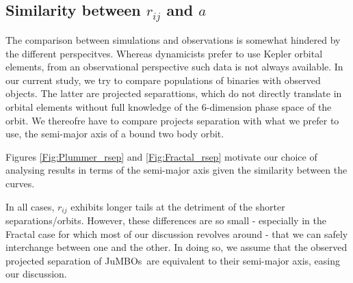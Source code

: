 \documentclass[submission,phys]{lib/SciPost}
\newcommand{\jumbos}{\mbox{JuMBOs}}
\begin{document}
\begin{appendix}
  \section{Similarity between $r_{ij}$ and $a$}\label{Appendix:A}

  The comparison between simulations and observations is somewhat
  hindered by the different perspecitves. Whereas dynamicists prefer
  to use Kepler orbital elements, from an observational perspective
  such data is not always available. In our current study, we try to
  compare populations of binaries with observed objects. The latter
  are projected separattions, which do not directly translate in
  orbital elements without full knowledge of the 6-dimension phase
  space of the orbit. We thereofre have to compare projects separation
  with what we prefer to use, the semi-major axis of a bound two body
  orbit.

  Figures \ref{Fig:Plummer_rsep} and \ref{Fig:Fractal_rsep} motivate
  our choice of analysing results in terms of the semi-major axis
  given the similarity between the curves.
    
  In all cases, $r_{ij}$ exhibits longer tails at the detriment of the
  shorter separations/orbits. However, these differences are so small
  - especially in the Fractal case for which most of our discussion
  revolves around - that we can safely interchange between one and the
  other. In doing so, we assume that the observed projected separation
  of \jumbos\, are equivalent to their semi-major axis, easing our
  discussion.
    

\end{appendix}
\end{document}
